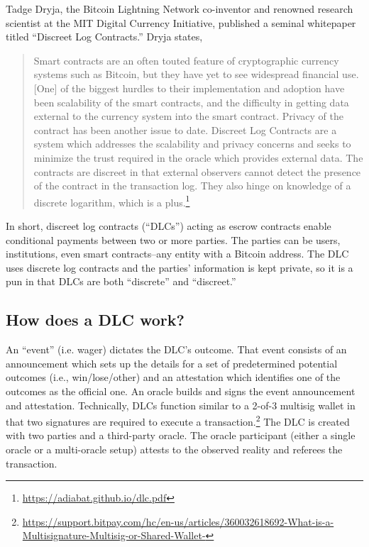 \documentclass[twoside, a4paper, 11pt]{article}
\begin{document}
  Tadge Dryja, the Bitcoin Lightning Network co-inventor and renowned research scientist at the MIT Digital Currency Initiative, published a seminal whitepaper titled “Discreet Log Contracts.” Dryja states,
  \begin{quote}
    Smart contracts are an often touted feature of cryptographic currency
    systems such as Bitcoin, but they have yet to see widespread financial use.
    [One] of the biggest hurdles to their implementation and adoption have been
    scalability of the smart contracts, and the difficulty in getting data external
    to the currency system into the smart contract. Privacy of the contract has
    been another issue to date. Discreet Log Contracts are a system which
    addresses the scalability and privacy concerns and seeks to minimize the
    trust required in the oracle which provides external data. The contracts are
    discreet in that external observers cannot detect the presence of the contract
    in the transaction log. They also hinge on knowledge of a discrete logarithm,
    which is a plus.\footnote{\url{https://adiabat.github.io/dlc.pdf}}
  \end{quote}

  In short, discreet log contracts (“DLCs”) acting as escrow contracts enable conditional payments between two or more parties. The parties can be users, institutions, even smart contracts–any entity with a Bitcoin address. The DLC uses discrete log contracts and the parties’ information is kept private, so it is a pun in that DLCs are both “discrete” and “discreet.”

  \subsection{How does a DLC work?}

  An “event” (i.e. wager) dictates the DLC’s outcome. That event consists of an announcement which sets up the details for a set of predetermined potential outcomes (i.e., win/lose/other) and an attestation which identifies one of the outcomes as the official one. An oracle builds and signs the event announcement and attestation. Technically, DLCs function similar to a 2-of-3 multisig wallet in that two signatures are required to execute a transaction.\footnote{\url{https://support.bitpay.com/hc/en-us/articles/360032618692-What-is-a-Multisignature-Multisig-or-Shared-Wallet-}} The DLC is created with two parties and a third-party oracle. The oracle participant (either a single oracle or a multi-oracle setup) attests to the observed reality and referees the transaction.
\end{document}
